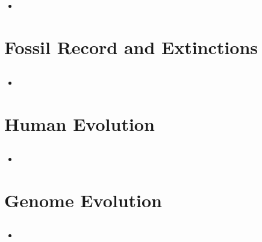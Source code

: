 \documentclass[12pt,a4paper]{article}
\begin{document}
\subsection{}
\begin{itemize}
    \item 
\end{itemize}

\clearpage
\section{Fossil Record and Extinctions}
\subsection{}
\begin{itemize}
    \item 
\end{itemize}

\clearpage
\setcounter{section}{19}
\section{Human Evolution}
\subsection{}
\begin{itemize}
    \item 
\end{itemize}

\clearpage
\setcounter{section}{14}
\section{Genome Evolution}
\subsection{}
\begin{itemize}
    \item 
\end{itemize}
\end{document}
